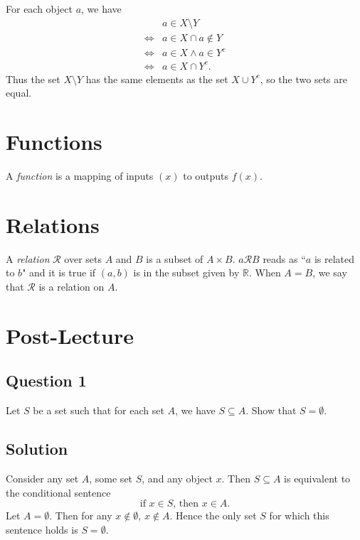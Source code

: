 \documentclass{article}
\begin{document}
    \vspace{1.5mm}
    For each object $a$, we have 
    \begin{align*}
        &a \in X \setminus Y \\
        \iff& a \in X \cap a \notin Y \\
        \iff& a \in X \land a \in Y^{c} \\
        \iff& a \in X \cap Y^{c}.
    \end{align*}
    Thus the set $X \setminus Y$ has the same elements as the set $X \cup Y^{c}$, so the two sets are equal.

\section*{Functions}
    A \textit{function} is a mapping of inputs $(x)$ to outputs $f(x)$.

\section*{Relations}
    A \textit{relation} $\mathcal{R}$ over sets $A$ and $B$ is a subset of $A \times B$. $a \mathcal{R} B$ reads as ``$a$ is related to $b$" and it is true if $(a, b)$ is in the subset given by $\mathbb{R}$. When $A = B$, we say that $\mathcal{R}$ is a relation on $A$.

\section*{Post-Lecture}

\subsection*{Question 1}
    Let $S$ be a set such that for each set $A$, we have $S \subseteq A$. Show that $S = \emptyset$.
    
\subsection*{Solution}
    Consider any set $A$, some set $S$, and any object $x$. Then $S \subseteq A$ is equivalent to the conditional sentence $$\text{if $x \in S$, then $x \in A$.}$$ Let $A = \emptyset$. Then for any $x \notin \emptyset$, $x \notin A$. Hence the only set $S$ for which this sentence holds is $S = \emptyset$.
\end{document}
